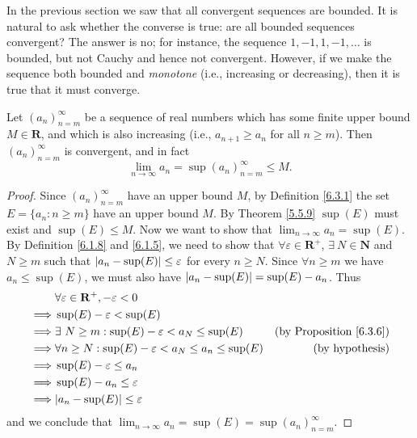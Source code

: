 \begin{note}
    In the previous section we saw that all convergent sequences are bounded.
    It is natural to ask whether the converse is true:
    are all bounded sequences convergent?
    The answer is no;
    for instance, the sequence \(1, -1, 1, -1, \dots\) is bounded, but not Cauchy and hence not convergent.
    However, if we make the sequence both bounded and \emph{monotone} (i.e., increasing or decreasing), then it is true that it must converge.
\end{note}

\begin{proposition}\label{6.3.8}
    Let \((a_n)_{n = m}^\infty\) be a sequence of real numbers which has some finite upper bound \(M \in \mathbf{R}\), and which is also increasing (i.e., \(a_{n + 1} \geq a_n\) for all \(n \geq m\)).
    Then \((a_n)_{n = m}^\infty\) is convergent, and in fact
    \[
        \lim_{n \to \infty} a_n = \sup(a_n)_{n = m}^\infty \leq M.
    \]
\end{proposition}

\begin{proof}
    Since \((a_n)_{n = m}^\infty\) have an upper bound \(M\), by Definition \ref{6.3.1} the set \(E = \{a_n : n \geq m\}\) have an upper bound \(M\).
    By Theorem \ref{5.5.9} \(\sup(E)\) must exist and \(\sup(E) \leq M\).
    Now we want to show that \(\lim_{n \to \infty} a_n = \sup(E)\).
    By Definition \ref{6.1.8} and \ref{6.1.5}, we need to show that \(\forall \varepsilon \in \mathbf{R}^+\), \(\exists\ N \in \mathbf{N}\) and \(N \geq m\) such that \(\abs*{a_n - \sup(E)} \leq \varepsilon\) for every \(n \geq N\).
    Since \(\forall n \geq m\) we have \(a_n \leq \sup(E)\), we must also have \(\abs*{a_n - \sup(E)} = \sup(E) - a_n\).
    Thus
    \begin{align*}
                 & \forall \varepsilon \in \mathbf{R}^+, -\varepsilon < 0                                                     \\
        \implies & \sup(E) - \varepsilon < \sup(E)                                                                            \\
        \implies & \exists\ N \geq m : \sup(E) - \varepsilon < a_N \leq \sup(E)         & \text{(by Proposition \ref{6.3.6})} \\
        \implies & \forall n \geq N : \sup(E) - \varepsilon < a_N \leq a_n \leq \sup(E) & \text{(by hypothesis)}              \\
        \implies & \sup(E) - \varepsilon \leq a_n                                                                             \\
        \implies & \sup(E) - a_n \leq \varepsilon                                                                             \\
        \implies & \abs*{a_n - \sup(E)} \leq \varepsilon
    \end{align*}
    and we conclude that \(\lim_{n \to \infty} a_n = \sup(E) = \sup(a_n)_{n = m}^\infty\).
\end{proof}


